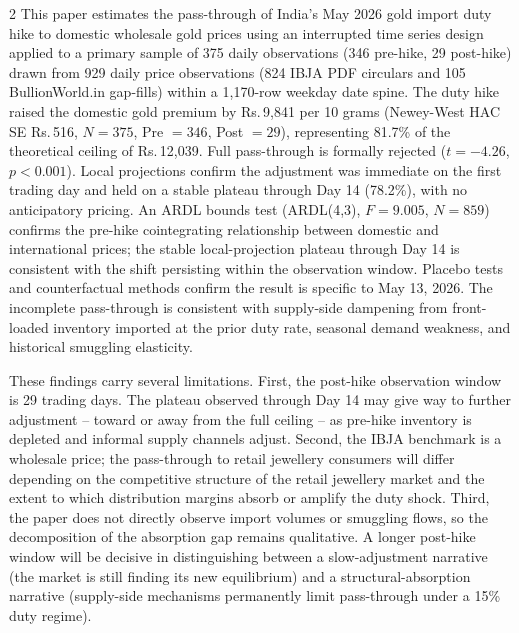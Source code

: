 \documentclass[12pt]{article}
\begin{document}
\begin{multicols}{2}
This paper estimates the pass-through of India's May 2026 gold import duty hike to domestic wholesale gold prices using an interrupted time series design applied to a primary sample of 375 daily observations (346 pre-hike, 29 post-hike) drawn from 929 daily price observations (824 IBJA PDF circulars and 105 BullionWorld.in gap-fills) within a 1,170-row weekday date spine. The duty hike raised the domestic gold premium by Rs.\,9,841 per 10 grams (Newey-West HAC SE Rs.\,516, $N = 375$, Pre $= 346$, Post $= 29$), representing 81.7\% of the theoretical ceiling of Rs.\,12,039. Full pass-through is formally rejected ($t = -4.26$, $p < 0.001$). Local projections confirm the adjustment was immediate on the first trading day and held on a stable plateau through Day 14 (78.2\%), with no anticipatory pricing. An ARDL bounds test (ARDL(4,3), $F = 9.005$, $N = 859$) confirms the pre-hike cointegrating relationship between domestic and international prices; the stable local-projection plateau through Day 14 is consistent with the shift persisting within the observation window. Placebo tests and counterfactual methods confirm the result is specific to May 13, 2026. The incomplete pass-through is consistent with supply-side dampening from front-loaded inventory imported at the prior duty rate, seasonal demand weakness, and historical smuggling elasticity.

These findings carry several limitations. First, the post-hike observation window is 29 trading days. The plateau observed through Day 14 may give way to further adjustment -- toward or away from the full ceiling -- as pre-hike inventory is depleted and informal supply channels adjust. Second, the IBJA benchmark is a wholesale price; the pass-through to retail jewellery consumers will differ depending on the competitive structure of the retail jewellery market and the extent to which distribution margins absorb or amplify the duty shock. Third, the paper does not directly observe import volumes or smuggling flows, so the decomposition of the absorption gap remains qualitative. A longer post-hike window will be decisive in distinguishing between a slow-adjustment narrative (the market is still finding its new equilibrium) and a structural-absorption narrative (supply-side mechanisms permanently limit pass-through under a 15\% duty regime).




\end{multicols}
\end{document}
